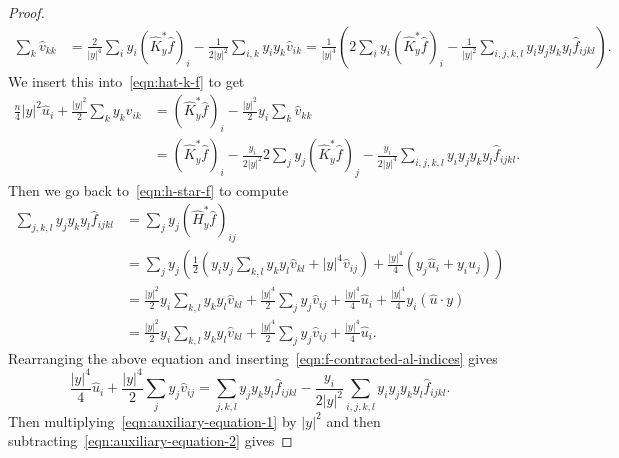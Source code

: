 \documentclass[10pt,a4paper]{amsart}
\newcommand{\abs}[1]{\lvert #1 \rvert}
\begin{document}
\begin{proof}
\begin{equation}
\begin{split}
\sum_k
\widehat v_{kk}
&=
\frac{2}{\abs{y}^4}
\sum_i
y_i(\widehat{K}^*_y\widehat f)_i
-
\frac{1}{2\abs{y}^2}
\sum_{i,k}
y_iy_k\widehat v_{ik}
=
\frac{1}{\abs{y}^4}
\left(
2
\sum_i
y_i(\widehat{K}^*_y\widehat f)_i
-
\frac{1}{\abs{y}^2}
\sum_{i,j,k,l}
y_iy_jy_ky_l
\widehat f_{ijkl}
\right).
\end{split}
\end{equation}
We insert this into~\eqref{eqn:hat-k-f} to get
\begin{equation}
\label{eqn:auxiliary-equation-1}
\begin{split}
\frac{n}{4}\abs{y}^2\widehat u_i
+
\frac{\abs{y}^2}{2}
\sum_k y_k\widehat v_{ik}
&=
(\widehat{K}^*_y\widehat f)_i
-
\frac{\abs{y}^2}{2}
y_i
\sum_k \widehat v_{kk}
\\
&=
(\widehat{K}^*_y\widehat f)_i
-
\frac{y_i}{2\abs{y}^2}
2\sum_{j}y_j(\widehat{K}^*_y\widehat f)_j
-
\frac{y_i}{2\abs{y}^4}
\sum_{i,j,k,l}
y_iy_jy_ky_l
\widehat f_{ijkl}
.
\end{split}
\end{equation}
Then we go back to~\eqref{eqn:h-star-f} to compute
\begin{equation}
\begin{split}
\sum_{j,k,l}y_jy_ky_l\widehat f_{ijkl}
&=
\sum_{j}
y_j(\widehat{H}^*_y\widehat f)_{ij}
\\
&=
\sum_jy_j
\left(
\frac12
\left(
y_iy_j
\sum_{k,l}
y_ky_l\widehat v_{kl}
+
\abs{y}^4
\widehat v_{ij}
\right)
+
\frac{\abs{y}^4}{4}
\left(
y_j\widehat u_i
+
y_i\widehat u_j
\right)
\right)
\\
&=
\frac{\abs{y}^2}{2}
y_i
\sum_{k,l}
y_ky_l
\widehat v_{kl}
+
\frac{\abs{y}^4}{2}
\sum_jy_j\widehat v_{ij}
+
\frac{\abs{y}^4}{4}\widehat u_i
+
\frac{\abs{y}^4}{4}y_i(\widehat u \cdot y)
\\
&=
\frac{\abs{y}^2}{2}
y_i
\sum_{k,l}
y_ky_l
\widehat v_{kl}
+
\frac{\abs{y}^4}{2}
\sum_jy_j\widehat v_{ij}
+
\frac{\abs{y}^4}{4}\widehat u_i.
\end{split}
\end{equation}
Rearranging the above equation and inserting~\eqref{eqn:f-contracted-al-indices} gives
\begin{equation}
\label{eqn:auxiliary-equation-2}
\frac{\abs{y}^4}{4}\widehat u_i
+
\frac{\abs{y}^4}{2}
\sum_jy_j\widehat v_{ij}
=
\sum_{j,k,l}
y_jy_ky_l
\widehat f_{ijkl}
-
\frac{y_i}{2\abs{y}^2}
\sum_{i,j,k,l}
y_iy_jy_ky_l
\widehat f_{ijkl}.
\end{equation}
Then multiplying~\eqref{eqn:auxiliary-equation-1} by $\abs{y}^2$ and then subtracting~\eqref{eqn:auxiliary-equation-2} gives

\end{proof}
\end{document}

